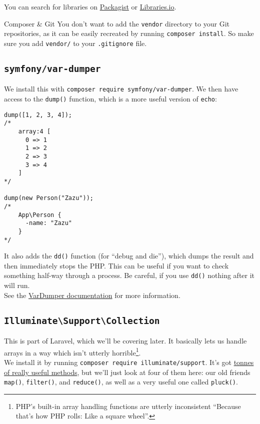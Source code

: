 You can search for libraries on \href{https://packagist.org}{Packagist} or \href{https://libraries.io/search?languages=PHP}{Libraries.io}.


\begin{infobox}{Composer \& Git}
    You don't want to add the \texttt{vendor} directory to your Git repositories, as it can be easily recreated by running \texttt{composer install}. So make sure you add \texttt{vendor/} to your \texttt{.gitignore} file.
\end{infobox}


\subsection{\texttt{symfony/var-dumper}}

We install this with \texttt{composer require symfony/var-dumper}. We then have access to the \texttt{dump()} function, which is a more useful version of \texttt{echo}:

\begin{verbatim}
dump([1, 2, 3, 4]);
/*
    array:4 [
      0 => 1
      1 => 2
      2 => 3
      3 => 4
    ]
*/

dump(new Person("Zazu"));
/*
    App\Person {
      -name: "Zazu"
    }
*/
\end{verbatim}

It also adds the \texttt{dd()} function (for ``debug and die''), which dumps the result and then immediately stops the PHP. This can be useful if you want to check something half-way through a process. Be careful, if you use \texttt{dd()} nothing after it will run.
\\

See the \href{https://symfony.com/doc/current/components/var_dumper.html}{VarDumper documentation} for more information.


\subsection{\texttt{Illuminate\textbackslash Support\textbackslash Collection}}

This is part of Laravel, which we'll be covering later. It basically lets us handle arrays in a way which isn't utterly horrible\footnote{PHP's built-in array handling functions are utterly inconsistent ``Because that's how PHP rolls: Like a square wheel''.}.
\\

We install it by running \texttt{composer require illuminate/support}. It's got \href{http://laravel.com/docs/master/collections#available-methods}{tonnes of really useful methods}, but we'll just look at four of them here: our old friends \texttt{map()}, \texttt{filter()}, and \texttt{reduce()}, as well as a very useful one called \texttt{pluck()}.
\\

